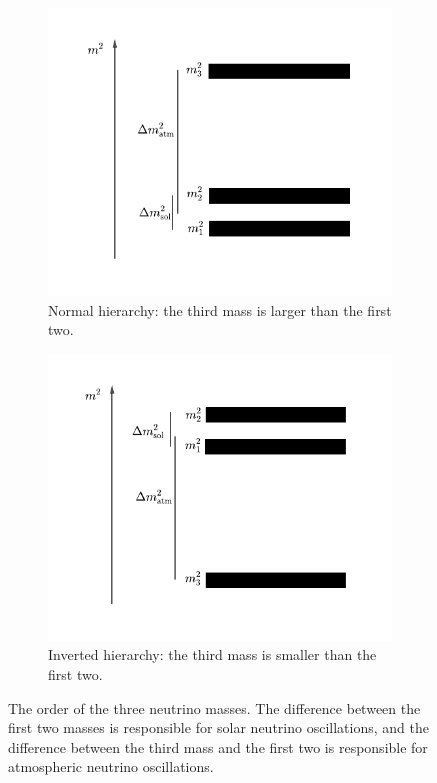 \begin{figure}[htp]
	\centering
	\begin{subfigure}[t]{0.48\textwidth}
		\centering
		\includegraphics[width=\textwidth]{chapters/assets/basics/masses-nh}
		\caption{Normal hierarchy: the third mass is larger than the first two.}
    \label{chap:basics-sec:flavor-isospin-pic-fig:masses-nh}
	\end{subfigure}
	\quad
	\begin{subfigure}[t]{0.48\textwidth}
		\centering
		\includegraphics[width=\textwidth]{chapters/assets/basics/masses-ih}
		\caption{Inverted hierarchy: the third mass is smaller than the first two.}
    \label{chap:basics-sec:flavor-isospin-pic-fig:masses-ih}
	\end{subfigure}
	\caption{The order of the three neutrino masses. The difference between the first two masses is responsible for solar neutrino oscillations, and the difference between the third mass and the first two is responsible for atmospheric neutrino oscillations.}
    \label{chap:basics-sec:flavor-isospin-pic-fig:masses}
\end{figure}

